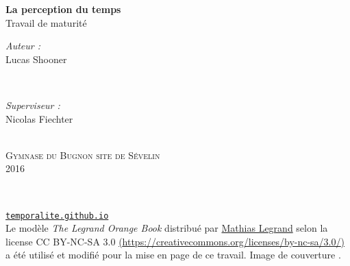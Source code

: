\documentclass[12pt,fleqn,oneside,french,openany]{book} %
\begin{document}

\begingroup
\thispagestyle{empty}
\centering
\vspace*{6,8cm}
\par\normalfont\fontsize{35}{35}\sffamily\selectfont

\textbf{La perception du temps}\\
{\LARGE Travail de maturité}\par %
\vspace*{0,8cm}
\begin{minipage}{0.46\textwidth}
	\begin{flushleft} \large
		\emph{Auteur :}\\
		{\Large Lucas Shooner} %
	\end{flushleft}
\end{minipage}
~
\begin{minipage}{0.46\textwidth}
	\begin{flushright} \large
		\emph{Superviseur :} \\
		{\Large Nicolas Fiechter} %
	\end{flushright}
\end{minipage} \\ 
{{\large \textsc{Gymnase du Bugnon site de Sévelin}}} \\
{\large 2016}\\ \par
\endgroup


\newpage
~\vfill
\thispagestyle{empty}


\noindent \texttt{\href{https://temporalite.github.io}{temporalite.github.io}}\\ 

\noindent Le modèle \emph{The Legrand Orange Book} distribué par \href{legrand.mathias@gmail.com}{Mathias Legrand} selon la license CC BY-NC-SA 3.0 \href{https://creativecommons.org/licenses/by-nc-sa/3.0/}{ (\url{https://creativecommons.org/licenses/by-nc-sa/3.0/})} a été utilisé et modifié pour la mise en page de ce travail. Image de couverture \cite{imgtitre}. \\ 
\end{document}
